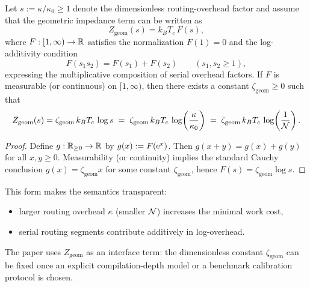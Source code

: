 \begin{proposition}
\label{prop:Zgeom_log}
Let $s:=\kappa/\kappa_0\ge 1$ denote the dimensionless routing-overhead factor and assume that the geometric impedance term can be written as
\begin{equation}
  Z_{\mathrm{geom}}(s)=k_B T_c\,F(s),
\end{equation}
where $F:[1,\infty)\to\mathbb{R}$ satisfies the normalization $F(1)=0$ and the log-additivity condition
\begin{equation}
  F(s_1 s_2)=F(s_1)+F(s_2)\qquad (s_1,s_2\ge 1),
\end{equation}
expressing the multiplicative composition of serial overhead factors. If $F$ is measurable (or continuous) on $[1,\infty)$, then there exists a constant $\zeta_{\mathrm{geom}}\ge 0$ such that
\begin{equation}
  Z_{\mathrm{geom}}(s)=\zeta_{\mathrm{geom}}\,k_B T_c\,\log s
  \;=\;\zeta_{\mathrm{geom}}\,k_B T_c\,\log\!\left(\frac{\kappa}{\kappa_0}\right)
  \;=\;\zeta_{\mathrm{geom}}\,k_B T_c\,\log\!\left(\frac{1}{\mathcal{N}}\right).
\end{equation}
\end{proposition}

\begin{proof}
Define $g:\mathbb{R}_{\ge 0}\to\mathbb{R}$ by $g(x):=F(\mathrm{e}^{x})$. Then $g(x+y)=g(x)+g(y)$ for all $x,y\ge 0$.
Measurability (or continuity) implies the standard Cauchy conclusion $g(x)=\zeta_{\mathrm{geom}} x$ for some constant $\zeta_{\mathrm{geom}}$, hence $F(s)=\zeta_{\mathrm{geom}}\log s$.
\end{proof}

This form makes the semantics transparent:
\begin{itemize}
  \item larger routing overhead $\kappa$ (smaller $\mathcal{N}$) increases the minimal work cost,
  \item serial routing segments contribute additively in log-overhead.
\end{itemize}
The paper uses $Z_{\mathrm{geom}}$ as an interface term: the dimensionless constant $\zeta_{\mathrm{geom}}$ can be fixed once an explicit compilation-depth model or a benchmark calibration protocol is chosen.


